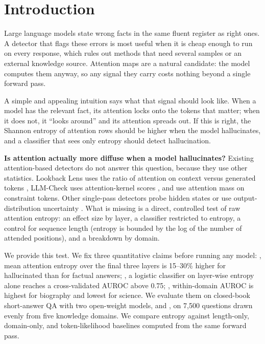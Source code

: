 \section{Introduction}
\label{sec:intro}

Large language models state wrong facts in the same fluent register as right ones.
A detector that flags these errors is most useful when it is cheap enough to run on every response, which rules out methods that need several samples or an external knowledge source.
Attention maps are a natural candidate: the model computes them anyway, so any signal they carry costs nothing beyond a single forward pass.

A simple and appealing intuition says what that signal should look like.
When a model has the relevant fact, its attention locks onto the tokens that matter; when it does not, it ``looks around'' and its attention spreads out.
If this is right, the Shannon entropy of attention rows should be higher when the model hallucinates, and a classifier that sees only entropy should detect hallucination.

{\bf Is attention actually more diffuse when a model hallucinates?}
Existing attention-based detectors do not answer this question, because they use other statistics.
Lookback Lens uses the ratio of attention on context versus generated tokens \citep{chuang2024lookback}, LLM-Check uses attention-kernel scores \citep{sriramanan2024llmcheck}, and \citet{yuksekgonul2024attention} use attention mass on constraint tokens.
Other single-pass detectors probe hidden states \citep{azaria2023internal,chen2024inside} or use output-distribution uncertainty \citep{kuhn2023semantic,manakul2023selfcheckgpt}.
What is missing is a direct, controlled test of raw attention entropy: an effect size by layer, a classifier restricted to entropy, a control for sequence length (entropy is bounded by the log of the number of attended positions), and a breakdown by domain.

We provide this test.
We fix three quantitative claims before running any model:
\Hone, mean attention entropy over the final three layers is 15--30\% higher for hallucinated than for factual answers;
\Htwo, a logistic classifier on layer-wise entropy alone reaches a cross-validated AUROC above 0.75;
\Hthree, within-domain AUROC is highest for biography and lowest for science.
We evaluate them on closed-book short-answer QA with two open-weight models, \qwen and \llama, on 7,500 questions drawn evenly from five knowledge domains.
We compare entropy against length-only, domain-only, and token-likelihood baselines computed from the same forward pass.


